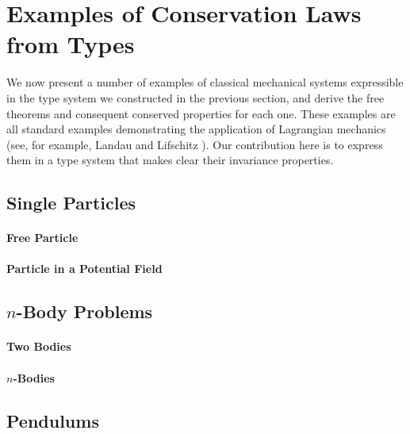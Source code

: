 \documentclass[preprint]{sigplanconf}
\newcommand{\sepbar}{\mathrel|}
\theoremstyle{examplestyle}
\begin{document}
\section{Examples of Conservation Laws from Types}
\label{sec:examples}

We now present a number of examples of classical mechanical systems
expressible in the type system we constructed in the previous section,
and derive the free theorems and consequent conserved properties for
each one. These examples are all standard examples demonstrating the
application of Lagrangian mechanics (see, for example, Landau and
Lifschitz \cite{landau60mechanics}). Our contribution here is to
express them in a type system that makes clear their invariance
properties.

\subsection{Single Particles}


\paragraph{Free Particle}

\paragraph{Particle in a Potential Field}

\subsection{$n$-Body Problems}

\paragraph{Two Bodies}

\paragraph{$n$-Bodies}

\subsection{Pendulums}
\end{document}
